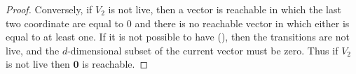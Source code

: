 \begin{proof}
Conversely, if $V_2$ is not live, then a vector is reachable in which the last two coordinate are equal to $0$ and there is no reachable vector in which either is equal to at least one.
If it is not possible to have (), then the transitions are not live, and the
$d$-dimensional subset of the current vector must be zero.
Thus if $V_2$ is not live then 
$\textbf{0}$ is reachable.
\end{proof}








